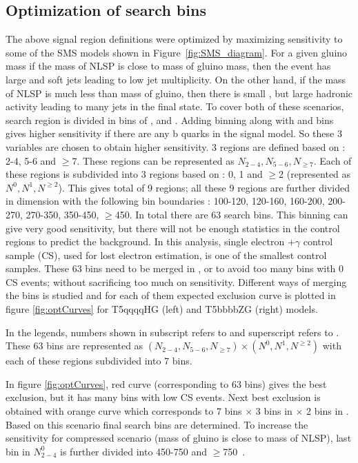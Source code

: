 \subsection{Optimization of search bins}
The above signal region definitions were optimized by maximizing sensitivity to some of the SMS models shown in Figure~\ref{fig:SMS_diagram}.
For a given gluino mass if the mass of NLSP is close to mass of gluino mass, then the event has large \ptmiss and soft jets leading to low jet multiplicity. On the other hand, if the mass of NLSP is much less than mass of gluino, then there is small \ptmiss, but large hadronic activity leading to many jets in the final state. To cover both of these scenarios, search region is divided in bins of \nj, \nb and \ptmiss. Adding \nb binning along with \nj and \ptmiss bins gives higher sensitivity if there are any b quarks in the signal model. So these 3 variables are chosen to obtain higher sensitivity. 3 regions are defined based on \nj : 2-4, 5-6 and $\geq$7. These regions can be represented as $N_{2-4}, N_{5-6}, N_{\geq7}$. Each of these regions is subdivided into 3 regions based on \nb : 0, 1 and $\geq$2 (represented as $N^{0}, N^{1}, N^{\geq2}$). This gives total of 9 regions; all these 9 regions are further divided in \ptmiss dimension with the following bin boundaries : 100-120, 120-160, 160-200, 200-270, 270-350, 350-450, $\geq$450. In total there are 63 search bins. This binning can give very good sensitivity, but there will not be enough statistics in the control regions to predict the background. In this analysis, single electron $+\gamma$ control sample (CS), used for lost electron estimation, is one of the smallest control samples. These 63 bins need to be merged in \nj, \nb or \ptmiss to avoid too many bins with 0 CS events; without sacrificing too much on sensitivity. Different ways of merging the bins is studied and for each of them expected exclusion curve is plotted in figure \ref{fig:optCurves} for T5qqqqHG (left) and T5bbbbZG (right) models.

In the legends, numbers shown in subscript refers to \nj and superscript refers to \nb. These 63 bins are represented as $(N_{2-4}, N_{5-6}, N_{\geq7}) \times (N^{0}, N^{1}, N^{\geq2})$ with each of these regions subdivided into 7 \ptmiss bins.

In figure \ref{fig:optCurves}, red curve (corresponding to 63 bins) gives the best exclusion, but it has many bins with low CS events. Next best exclusion is obtained with orange curve which corresponds to 7 \ptmiss bins $\times$ 3 bins in \nj $\times$ 2 bins in \nb. Based on this scenario final search bins are determined. To increase the sensitivity for compressed scenario (mass of gluino is close to mass of NLSP), last \ptmiss bin in $N_{2-4}^{0}$ is further divided into 450-750 and $\geq$750~\gev.


